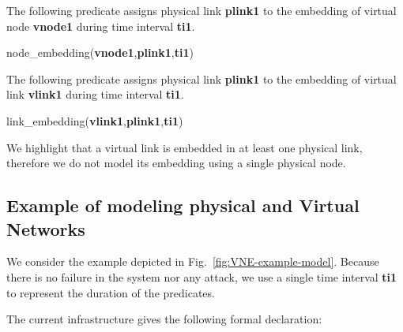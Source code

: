 The following predicate assigns physical link \textbf{plink1} to the embedding of virtual node \mbox{\textbf{vnode1}} during time interval \textbf{ti1}.
\begin{myformula}
node\_embedding(\textbf{vnode1},\textbf{plink1},\textbf{ti1})
\end{myformula}


The following predicate assigns physical link \textbf{plink1} to the embedding of virtual link \textbf{vlink1} during time interval \textbf{ti1}.
\begin{myformula}
link\_embedding(\textbf{vlink1},\textbf{plink1},\textbf{ti1})
\end{myformula}


We highlight that a virtual link is embedded in at least one physical link, therefore we do not model its embedding using a single physical node.


\subsection{Example of modeling physical and Virtual Networks}

We consider the example depicted in Fig.~\ref{fig:VNE-example-model}.
Because there is no failure in the system nor any attack, we use a single time interval \textbf{ti1} to represent the duration of the predicates.



The current infrastructure gives the following formal declaration:


